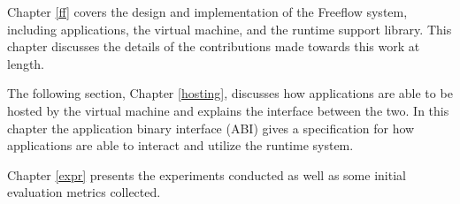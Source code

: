 Chapter \ref{ff} covers the design and implementation of the Freeflow system,
including applications, the virtual machine, and the runtime support library.
This chapter discusses the details of the contributions made towards this work
at length.

The following section, Chapter \ref{hosting}, discusses how applications are
able to be hosted by the virtual machine and explains the interface between the
two. In this chapter the application binary interface (ABI) gives a specification
for how applications are able to interact and utilize the runtime system.

Chapter \ref{expr} presents the experiments conducted as well as some initial
evaluation metrics collected.
